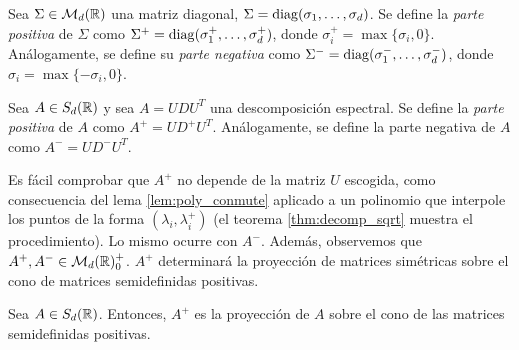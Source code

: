 \begin{definition}
    Sea $\Sigma \in \mathcal{M}_d(\mathbb{R})$ una matriz diagonal, $\Sigma = \operatorname{diag}(\sigma_1,\dots,\sigma_d)$. Se define la \emph{parte positiva} de $\Sigma$ como $\Sigma^+ = \operatorname{diag}(\sigma_1^+,\dots,\sigma_d^+)$, donde $\sigma_i^+ = \max\{\sigma_i,0\}$. Análogamente, se define su \emph{parte negativa} como $\Sigma^- = \operatorname{diag}(\sigma_1^-,\dots,\sigma_d^-)$, donde $\sigma_i = \max\{-\sigma_i,0\}$.

    Sea $A \in S_d(\mathbb{R})$ y sea $A = UDU^T$ una descomposición espectral. Se define la \emph{parte positiva} de $A$ como $A^+ = UD^+U^T$. Análogamente, se define la parte negativa de $A$ como $A^- = UD^-U^T$.
\end{definition}

Es fácil comprobar que $A^+$ no depende de la matriz $U$ escogida, como consecuencia del lema \ref{lem:poly_conmute} aplicado a un polinomio que interpole los puntos de la forma $(\lambda_i,\lambda_i^+)$ (el teorema \ref{thm:decomp_sqrt} muestra el procedimiento). Lo mismo ocurre con $A^-$. Además, observemos que $A^+, A^- \in \mathcal{M}_d(\mathbb{R})^+_0$. $A^+$ determinará la proyección de matrices simétricas sobre el cono de matrices semidefinidas positivas.

\begin{thm}
    Sea $A \in S_d(\mathbb{R})$. Entonces, $A^+$ es la proyección de $A$ sobre el cono de las matrices semidefinidas positivas.
\end{thm}


